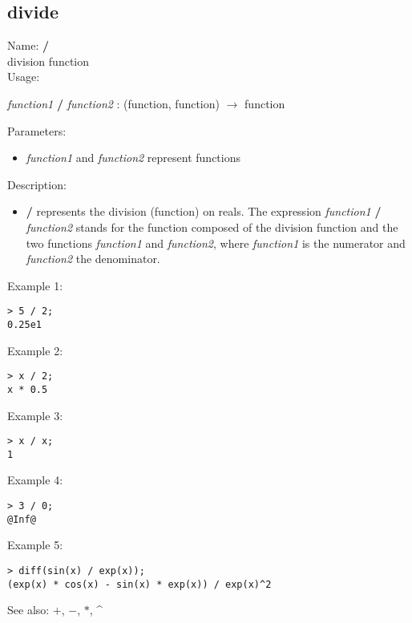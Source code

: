 \subsection{ divide }
\noindent Name: \textbf{/}\\
division function\\

\noindent Usage: 
\begin{center}
\emph{function1} \textbf{/} \emph{function2} : (\textsf{function}, \textsf{function}) $\rightarrow$ \textsf{function}\\
\end{center}
Parameters: 
\begin{itemize}
\item \emph{function1} and \emph{function2} represent functions
\end{itemize}
\noindent Description: \begin{itemize}

\item \textbf{/} represents the division (function) on reals. 
   The expression \emph{function1} \textbf{/} \emph{function2} stands for
   the function composed of the division function and the two
   functions \emph{function1} and \emph{function2}, where \emph{function1} is
   the numerator and \emph{function2} the denominator.
\end{itemize}
\noindent Example 1: 
\begin{center}\begin{minipage}{15cm}\begin{Verbatim}[frame=single]
> 5 / 2;
0.25e1
\end{Verbatim}
\end{minipage}\end{center}
\noindent Example 2: 
\begin{center}\begin{minipage}{15cm}\begin{Verbatim}[frame=single]
> x / 2;
x * 0.5
\end{Verbatim}
\end{minipage}\end{center}
\noindent Example 3: 
\begin{center}\begin{minipage}{15cm}\begin{Verbatim}[frame=single]
> x / x;
1
\end{Verbatim}
\end{minipage}\end{center}
\noindent Example 4: 
\begin{center}\begin{minipage}{15cm}\begin{Verbatim}[frame=single]
> 3 / 0;
@Inf@
\end{Verbatim}
\end{minipage}\end{center}
\noindent Example 5: 
\begin{center}\begin{minipage}{15cm}\begin{Verbatim}[frame=single]
> diff(sin(x) / exp(x));
(exp(x) * cos(x) - sin(x) * exp(x)) / exp(x)^2
\end{Verbatim}
\end{minipage}\end{center}
See also: \textbf{$+$}, \textbf{$-$}, \textbf{$*$}, \textbf{\^}
